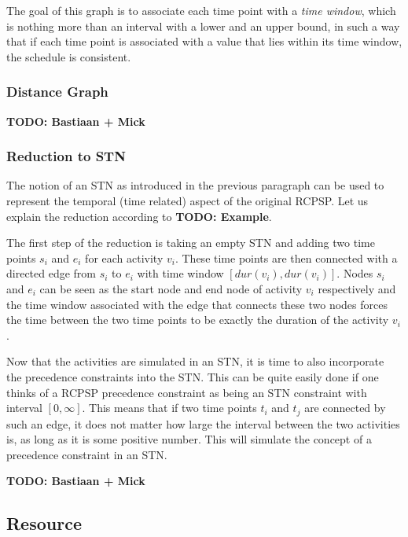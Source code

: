 \documentclass{article}
\theoremstyle{definition}
\newcommand{\TODO}[1]{{\color{red}\textbf{TODO: #1}}}
\newcommand{\dur}[1]{\ensuremath{dur(v_{#1})}} %
\begin{document}
The goal of this graph is to associate each time point with a \emph{time window}, which is nothing more than an interval with a lower and an upper bound, in such a way that if each time point is associated with a value that lies within its time window, the schedule is consistent.

\subsubsection{Distance Graph}


\TODO{Bastiaan + Mick}


\subsubsection{Reduction to STN}
The notion of an STN as introduced in the previous paragraph can be used to represent the temporal (time related) aspect of the original RCPSP. Let us explain the reduction according to \TODO{Example}.

The first step of the reduction is taking an empty STN and adding two time points $s_i$ and $e_i$ for each activity $v_i$. 
These time points are then connected with a directed edge from $s_i$ to $e_i$ with time window $[\dur{i}, \dur{i}]$. 
Nodes $s_i$ and $e_i$ can be seen as the start node and end node of activity $v_i$ respectively and the time window associated with the edge that connects these two nodes forces the time between the two time points to be exactly the duration of the activity $v_i$.

Now that the activities are simulated in an STN, it is time to also incorporate the precedence constraints into the STN. This can be quite easily done if one thinks of a RCPSP precedence constraint as being an STN constraint with interval $[0,\infty]$. This means that if two time points $t_i$ and $t_j$ are connected by such an edge, it does not matter how large the interval between the two activities is, as long as it is some positive number. This will simulate the concept of a precedence constraint in an STN.

\TODO{Bastiaan + Mick}


\subsection{Resource}
\end{document}
